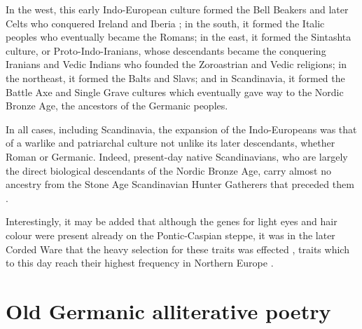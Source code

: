   In the west, this early Indo-European culture formed the Bell Beakers and later Celts who conquered Ireland and Iberia \parencite{McColl2026Celtic}; in the south, it formed the Italic peoples who eventually became the Romans; in the east, it formed the Sintashta culture, or Proto-Indo-Iranians, whose descendants became the conquering Iranians and Vedic Indians who founded the Zoroastrian and Vedic religions; in the northeast, it formed the Balts and Slavs; and in Scandinavia, it formed the Battle Axe and Single Grave cultures which eventually gave way to the Nordic Bronze Age, the ancestors of the Germanic peoples.

  In all cases, including Scandinavia, the expansion of the Indo-Europeans was that of a warlike and patriarchal culture not unlike its later descendants, whether Roman or Germanic.  Indeed, present-day native Scandinavians, who are largely the direct biological descendants of the Nordic Bronze Age, carry almost no ancestry from the Stone Age Scandinavian Hunter Gatherers that preceded them \parencite{Allentoft2024}.

  Interestingly, it may be added that although the genes for light eyes and hair colour were present already on the Pontic-Caspian steppe, it was in the later Corded Ware that the heavy selection for these traits was effected \parencites{Wilde2014}{Ju2021}{Perretti2025}, traits which to this day reach their highest frequency in Northern Europe \parencite{Frost2006}.



\section{Old Germanic alliterative poetry}

